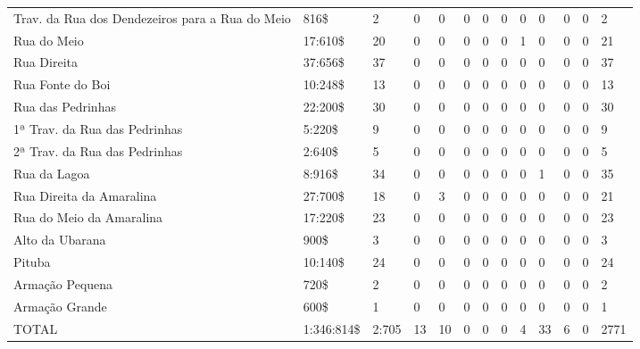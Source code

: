 \begin{sidewaystable}[!htp]
{\begin{minipage}{\textwidth}
\begin{tiny}
\begin{tabular}{m{3cm} m{1cm} l l l l l l l l l l l}
Trav. da Rua dos Dendezeiros para a Rua do Meio		&816\$		&2	&0	&0	&0	&0	&0	&0	&0	&0	&0	&2\\
Rua do Meio							&17:610\$	&20	&0	&0	&0	&0	&0	&1	&0	&0	&0	&21\\
Rua Direita							&37:656\$	&37	&0	&0	&0	&0	&0	&0	&0	&0	&0	&37\\
Rua Fonte do Boi						&10:248\$	&13	&0	&0	&0	&0	&0	&0	&0	&0	&0	&13\\
Rua das Pedrinhas						&22:200\$	&30	&0	&0	&0	&0	&0	&0	&0	&0	&0	&30\\
1ª Trav. da Rua das Pedrinhas				&5:220\$	&9	&0	&0	&0	&0	&0	&0	&0	&0	&0	&9\\
2ª Trav. da Rua das Pedrinhas				&2:640\$	&5	&0	&0	&0	&0	&0	&0	&0	&0	&0	&5\\
Rua da Lagoa							&8:916\$	&34	&0	&0	&0	&0	&0	&0	&1	&0	&0	&35\\
Rua Direita da Amaralina					&27:700\$	&18	&0	&3	&0	&0	&0	&0	&0	&0	&0	&21\\
Rua do Meio da Amaralina					&17:220\$	&23	&0	&0	&0	&0	&0	&0	&0	&0	&0	&23\\
Alto da Ubarana							&900\$		&3	&0	&0	&0	&0	&0	&0	&0	&0	&0	&3\\
Pituba								&10:140\$	&24	&0	&0	&0	&0	&0	&0	&0	&0	&0	&24\\
Armação Pequena							&720\$		&2	&0	&0	&0	&0	&0	&0	&0	&0	&0	&2\\
Armação Grande							&600\$		&1	&0	&0	&0	&0	&0	&0	&0	&0	&0	&1\\
\midrule
TOTAL								&1:346:814\$	&2:705	&13	&10	&0	&0	&0	&4	&33	&6	&0	&2771\\
\bottomrule
\end{tabular} 
\end{tiny}
\end{minipage}
}
{}
\end{sidewaystable}